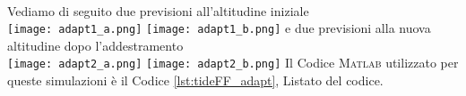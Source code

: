 	\\
	Vediamo di seguito due previsioni all'altitudine iniziale\\
	\texttt{[image: adapt1\_a.png]}
	\texttt{[image: adapt1\_b.png]}
	e due previsioni alla nuova altitudine dopo l'addestramento\\
	\texttt{[image: adapt2\_a.png]}
	\texttt{[image: adapt2\_b.png]}
	Il Codice \textsc{Matlab} utilizzato per queste simulazioni è il Codice \ref{lst:tideFF_adapt}, Listato del codice.